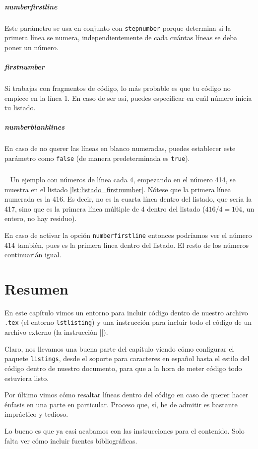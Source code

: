 \subparagraph{numberfirstline} Este parámetro se usa en conjunto con \texttt{stepnumber} porque determina si la primera línea se numera, independientemente de cada cuántas líneas se deba poner un número.

\subparagraph{firstnumber} Si trabajas con fragmentos de código, lo más probable es que tu código no empiece en la línea 1. En caso de ser así, puedes especificar en cuál número inicia tu listado.

\subparagraph{numberblanklines} En caso de no querer las líneas en blanco numeradas, puedes establecer este parámetro como \texttt{false} (de manera predeterminada es \texttt{true}).

\subparagraph{}~\newline
\indent Un ejemplo con números de línea cada 4, empezando en el número 414, se muestra en el listado \ref{lst:listado_firstnumber}. Nótese que la primera línea numerada es la 416. Es decir, no es la cuarta línea dentro del listado, que sería la 417, sino que es la primera línea múltiple de 4 dentro del listado ($416/4 = 104$, un entero, no hay residuo).

En caso de activar la opción \texttt{numberfirstline} entonces podríamos ver el número 414 también, pues es la primera línea dentro del listado. El resto de los números continuarián igual.





\section*{Resumen}



En este capítulo vimos un entorno para incluir código dentro de nuestro archivo \texttt{.tex} (el entorno \texttt{lstlisting}) y una instrucción para incluir todo el código de un archivo externo (la instrucción ||).

Claro, nos llevamos una buena parte del capítulo viendo cómo configurar el paquete \texttt{listings}, desde el soporte para caracteres en español hasta el estilo del código dentro de nuestro documento, para que a la hora de meter código todo estuviera listo.

Por último vimos cómo resaltar líneas dentro del código en caso de querer hacer énfasis en una parte en particular. Proceso que, sí, he de admitir es bastante impráctico y tedioso.

Lo bueno es que ya casi acabamos con las instrucciones para el contenido. Solo falta ver cómo incluir fuentes bibliográficas.